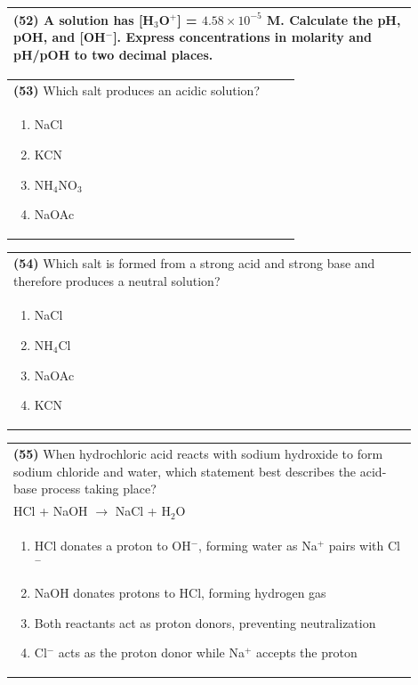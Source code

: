 \documentclass{article}
\begin{document}
\noindent\begin{tabular}{|p{0.9\linewidth}|}
\hline
\textbf{(52)} A solution has [H$_3$O$^+$] = $4.58\times10^{-5}$ M. Calculate the pH, pOH, and [OH$^-$]. Express concentrations in molarity and pH/pOH to two decimal places. \\[4cm]
\hline
\end{tabular}
\newpage

\noindent\begin{tabular}{|p{0.9\linewidth}|}
\hline
\textbf{(53)} Which salt produces an acidic solution? \\[0.2cm]
\begin{minipage}{0.85\linewidth}
\begin{enumerate}[label=\alph*.]
\item NaCl \item KCN \item NH$_4$NO$_3$ \item NaOAc
\end{enumerate}
\end{minipage}\\[0.2cm]
\hline
\end{tabular}

\noindent\begin{tabular}{|p{0.9\linewidth}|}
\hline
\textbf{(54)} Which salt is formed from a strong acid and strong base and therefore produces a neutral solution? \\[0.2cm]
\begin{minipage}{0.85\linewidth}
\begin{enumerate}[label=\alph*.]
\item NaCl \item NH$_4$Cl \item NaOAc \item KCN
\end{enumerate}
\end{minipage}\\[0.2cm]
\hline
\end{tabular}

\noindent\begin{tabular}{|p{0.9\linewidth}|}
\hline
\textbf{(55)} When hydrochloric acid reacts with sodium hydroxide to form sodium chloride and water, which statement best describes the acid-base process taking place?\\[0.2cm]
HCl + NaOH $\rightarrow$ NaCl + H$_2$O\\[0.2cm]
\begin{minipage}[t]{0.85\linewidth}
\begin{enumerate}[label=\alph*.]
\item HCl donates a proton to OH$^-$, forming water as Na$^+$ pairs with Cl$^-$
\item NaOH donates protons to HCl, forming hydrogen gas
\item Both reactants act as proton donors, preventing neutralization
\item Cl$^-$ acts as the proton donor while Na$^+$ accepts the proton
\end{enumerate}
\end{minipage}\\[0.2cm]
\hline
\end{tabular}
\end{document}
